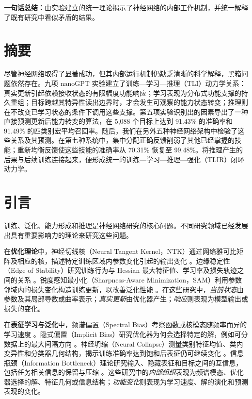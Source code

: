 \noindent\textbf{一句话总结：}由实验建立的统一理论揭示了神经网络的内部工作机制，并统一解释了既有研究中看似矛盾的结果。

\section*{摘要}

尽管神经网络取得了显著成功，但其内部运行机制仍缺乏清晰的科学解释，黑箱问题依然存在。九项 nanoGPT 实验建立了训练—学习—推理（TLI）动力学关系：真实更新引起依赖接收状态的有限幅度功能响应；学习表现为分布式功能支撑的持久重组；目标跨越其特异性读出边界时，才会发生可观察的能力状态转变；推理则在不改变已学习状态的条件下调用这些支撑。第五项实验识别出的因素导出了一种直接预测更新后能力转变的算法，在 5,088 个目标上达到 91.43\% 的准确率和 91.49\% 的四类别宏平均召回率。随后，我们在另外五种神经网络架构中检验了这些关系及其预测。在第七种系统中，集中分配正确反馈削弱了其他已经掌握的技能；重新均衡反馈使这些技能的准确率从 70.31\% 恢复至 99.48\%。将推理产生的后果与后续训练连接起来，便形成统一的训练—学习—推理—强化（TLIR）闭环动力学。

\section{引言}

训练、泛化、能力形成和推理是神经网络研究的核心问题。不同研究领域已经发展出具有重要影响力的理论来研究这些问题。

在\textbf{优化理论}中，神经切线核（Neural Tangent Kernel，NTK）通过网络雅可比矩阵及相应的核，描述特定训练区域内参数变化引起的输出变化 \cite{jacot2018}。边缘稳定性（Edge of Stability）研究训练行为与 Hessian 最大特征值、学习率及损失轨迹之间的关系 \cite{cohen2021}。锐度感知最小化（Sharpness-Aware Minimization，SAM）利用参数邻域内的损失变化构造训练更新，以改善泛化性能 \cite{foret2021}。在这些研究中，\emph{当前状态}由参数及其局部导数或曲率表示；\emph{真实更新}由优化器产生；\emph{响应}则表现为模型输出或损失的变化。

在\textbf{表征学习与泛化}中，频谱偏置（Spectral Bias）考察函数或核模态随频率而异的学习速度 \cite{rahaman2019}。隐式偏置（Implicit Bias）研究优化器为何会选择特定的解，例如可分数据上的最大间隔方向 \cite{soudry2018}。神经坍缩（Neural Collapse）测量类别特征均值、类内变异性和分类器几何结构，揭示训练准确率达到饱和后表征仍可继续变化 \cite{papyan2020}。信息瓶颈（Information Bottleneck）理论研究输入、隐藏表征和目标之间的互信息，包括任务相关信息的保留与压缩 \cite{tishby2015}。这些研究中的\emph{内部组织}表现为频谱模态、优化器选择的解、特征几何或信息结构；\emph{功能变化}则表现为学习速度、解的演化和预测表现的变化。

